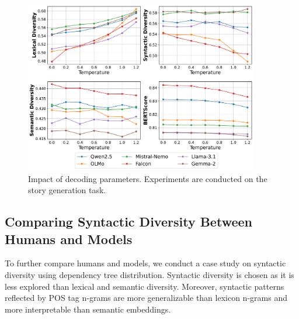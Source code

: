 \documentclass[11pt,a4paper]{article}
\begin{document}
\begin{figure}[h]
    \centering
    \includegraphics[width=0.91\textwidth]{figures/decoding.pdf}
    \caption{Impact of decoding parameters. Experiments are conducted on the story generation task.}
    \label{fig:decoding}
\end{figure}








\subsection{Comparing Syntactic Diversity Between Humans and Models}\label{sec:ComparisonHumansModels}



To further compare humans and models, we conduct a case study on syntactic diversity using dependency tree distribution. Syntactic diversity is chosen as it is less explored than lexical and semantic diversity. Moreover, syntactic patterns reflected by POS tag n-grams are more generalizable than lexicon n-grams and more interpretable than semantic embeddings.


\end{document}
